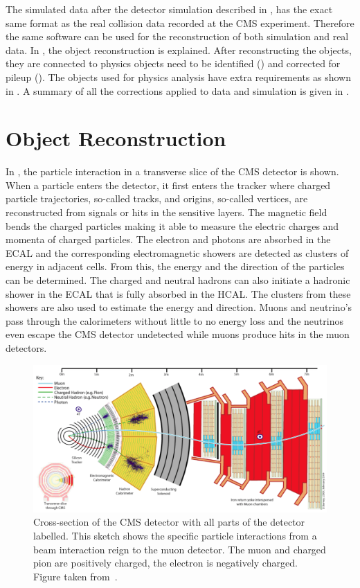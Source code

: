 The simulated data after the detector simulation described in , has the exact same format as the real collision data recorded at the CMS experiment. Therefore the same software can be used for the reconstruction of both simulation and real data. In , the object reconstruction is explained. After reconstructing the objects, they are connected to physics objects need to be identified () and corrected for pileup (). The objects used for physics analysis have extra requirements as shown in . A summary of all the corrections applied to data and simulation is given in .

\section{Object Reconstruction}
\label{sec:reco}
In , the particle interaction in a transverse slice of the CMS detector is shown. When a particle enters the detector, it first enters the tracker where charged particle trajectories, so-called tracks, and origins, so-called vertices, are reconstructed from signals or hits in the sensitive layers. The  magnetic field bends the charged particles making it able to measure the electric charges and momenta of charged particles. The electron and photons are absorbed in the ECAL and the corresponding electromagnetic showers are detected as clusters of energy in adjacent cells. From this, the energy and the direction of the particles can be determined. The charged and neutral hadrons can also initiate a hadronic shower in the ECAL that is fully absorbed in the HCAL. The clusters from these showers are also used to estimate the energy and direction. Muons and neutrino's pass through the calorimeters without little to no energy loss and the neutrinos even escape the CMS detector undetected while muons produce hits in the muon detectors. 
\begin{landscape}
\begin{figure}
	\centering
	\includegraphics[width=1.\linewidth]{4_EventRecoSelect/Figures/transversecms}
	\caption{Cross-section of the CMS detector with all parts of the detector labelled. This sketch shows the specific particle interactions from a beam interaction reign to the muon detector. The muon and charged pion are positively charged, the electron is negatively charged. Figure taken from~\cite{CMS-PRF-14-001}. }
	\label{fig:transversecms}
\end{figure}
\end{landscape}
